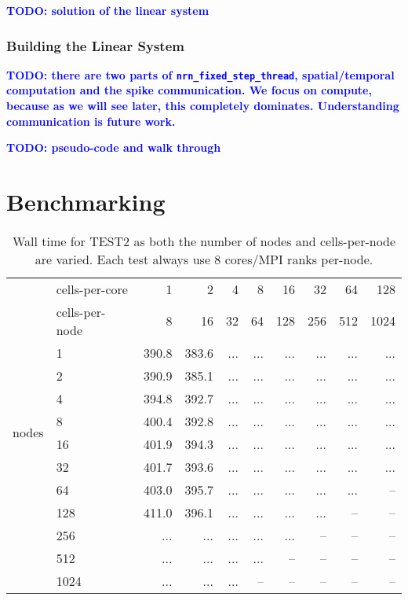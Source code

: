 \documentclass[11pt,a4paper]{article}
\newcommand{\todo}[1]{\textbf{\textcolor{Blue}{TODO: #1}}} %
\newcommand{\lst}[1]{\lstinline!#1!} %
\begin{document}
\todo{solution of the linear system}

\subsubsection{Building the Linear System}
\todo{there are two parts of \lst{nrn_fixed_step_thread}, spatial/temporal computation and the spike communication. We focus on compute, because as we will see later, this completely dominates. Understanding communication is future work.}

\todo{pseudo-code and walk through}

\section{Benchmarking}
\begin{table}[htp!]
    \centering
\begin{tabular}{l|l|rrrrrrrr|}
    \cline{2-10}
\multirow{2}{*}{}
& cells-per-core  &    1  & 2     & 4  & 8  & 16  & 32  & 64  & 128 \\
& cells-per-node  &    8  & 16    & 32 & 64 & 128 & 256 & 512 & 1024 \\
\hline
\multirow{8}{*}{nodes}
&1                & 390.8 & 383.6 & ... & ... & ... & ... & ... & ... \\
&2                & 390.9 & 385.1 & ... & ... & ... & ... & ... & ... \\
&4                & 394.8 & 392.7 & ... & ... & ... & ... & ... & ... \\
&8                & 400.4 & 392.8 & ... & ... & ... & ... & ... & ... \\
&16               & 401.9 & 394.3 & ... & ... & ... & ... & ... & ... \\
&32               & 401.7 & 393.6 & ... & ... & ... & ... & ... & ... \\
&64               & 403.0 & 395.7 & ... & ... & ... & ... & ... & --  \\
&128              & 411.0 & 396.1 & ... & ... & ... & ... & --  & --  \\
&256              & ...   & ...   & ... & ... & ... & --  & --  & --  \\
&512              & ...   & ...   & ... & ... & --  & --  & --  & --  \\
&1024             & ...   & ...   & ... & --  & --  & --  & --  & --  \\
\hline
\end{tabular}
\label{tbl:test2scaling}
\caption{Wall time for TEST2 as both the number of nodes and cells-per-node are varied. Each test always use 8 cores/MPI ranks per-node.}
\end{table}
\end{document}
